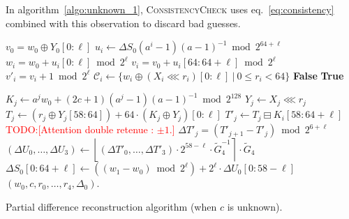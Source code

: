 \documentclass[submission,svgnames,journal=tosc]{iacrtrans}
\newcommand{\todo}[1]{\textcolor{red}{TODO:[#1]}}
\begin{document}
In algorithm~\ref{algo:unknown_1}, \textsc{ConsistencyCheck} uses
eq.~\eqref{eq:consistency} combined with this observation to discard bad guesses.



\begin{algorithm}
\begin{algorithmic}[1]
  \State $v_0 = w_0 \oplus Y_0[0:\ell]$ 
  \State $u_i \gets \Delta S_0 (a^i-1)(a-1)^{-1} \bmod 2^{64+\ell}$ 
  \State $w_i = w_0 + u_i[0:\ell] \bmod 2^{\ell}$ 
  \State $v_i = v_0 + u_i[64:64+\ell] \bmod 2^{\ell}$ 
  \State $v'_i = v_i + 1 \bmod 2^{\ell}$
  \State $\mathcal{C}_i \gets \{ w_i \oplus (X_i \lll r_i)[0:\ell]~|~ 0\leq r_i < 64\}$ 
  \State \Return \textbf{False} 
  \EndIf
  \EndFor
  \State \Return \textbf{True} 
  \EndProcedure

\State 
  
   
  \State $K_j \gets a^j w_0 + (2c+1)(a^j - 1)(a-1)^{-1} \bmod 2^{128}$ 
   
  \State $Y_j \gets X_j \lll r_j$ 
  \State $T_j \gets \left(r_j \oplus Y_j[58:64]\right) +  64 \cdot \left(K_j \oplus Y_j\right)[0:\ell]$ 
  \State $T'_j \gets T_j \boxminus  K_i[58:64+\ell]$ 
  \State \todo{Attention double retenue : $\pm 1$.}
  \State $\Delta T'_j = (T'_{j+1} - T'_j) \bmod 2^{6 + \ell}$  
  \State $(\Delta U_0, \dots, \Delta U_3) \gets \left\lfloor (\Delta T'_0, \dots, \Delta T'_3) \cdot 2^{58-\ell} \cdot \widetilde G_4^{-1} \right\rceil \cdot \widetilde G_4$ 
  \State $\Delta S_0[0:64+\ell] \gets \left((w_1 - w_0) \bmod 2^{\ell}\right) + 2^{\ell} \cdot \Delta U_0[0:58-\ell]$ 
  \State \Return $(w_0, c, r_0, \dots, r_4, \Delta_0)$.
  \EndIf
  \EndFor
  \EndFor
  \EndProcedure
\end{algorithmic}
\caption{Partial difference reconstruction algorithm (when $c$ is unknown).}
\label{algo:unknown_1}
\end{algorithm}
\end{document}

